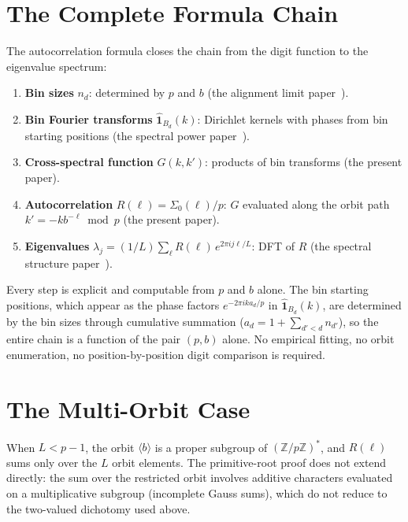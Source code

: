 \documentclass[12pt]{amsart}
\theoremstyle{definition}
\theoremstyle{remark}
\begin{document}
\section{The Complete Formula Chain}

The autocorrelation formula closes the chain from the digit
function to the eigenvalue spectrum:

\begin{enumerate}
\item \textbf{Bin sizes} $n_d$: determined by $p$ and $b$
      (the alignment limit paper~\cite{paper3}).
\item \textbf{Bin Fourier transforms}
      $\widehat{\mathbf{1}}_{B_d}(k)$: Dirichlet kernels with
      phases from bin starting positions (the spectral power
      paper~\cite{paper8}).
\item \textbf{Cross-spectral function} $G(k,k')$: products of
      bin transforms (the present paper).
\item \textbf{Autocorrelation} $R(\ell) = \Sigma_0(\ell)/p$:
      $G$ evaluated along the orbit path
      $k' = -kb^{-\ell} \bmod p$ (the present paper).
\item \textbf{Eigenvalues}
      $\lambda_j = (1/L) \sum_{\ell} R(\ell)\, e^{2\pi i
      j\ell/L}$: DFT of $R$ (the spectral structure
      paper~\cite{paper7}).
\end{enumerate}

Every step is explicit and computable from $p$ and $b$ alone.
The bin starting positions, which appear as the phase factors
$e^{-2\pi i k a_d / p}$ in $\widehat{\mathbf{1}}_{B_d}(k)$, are
determined by the bin sizes through cumulative summation
($a_d = 1 + \sum_{d' < d} n_{d'}$), so the entire chain is a
function of the pair $(p, b)$ alone. No empirical fitting, no
orbit enumeration, no position-by-position digit comparison is
required.

\section{The Multi-Orbit Case}\label{sec:multi-orbit}

When $L < p - 1$, the orbit $\langle b \rangle$ is a proper
subgroup of $(\mathbb{Z}/p\mathbb{Z})^{*}$, and $R(\ell)$ sums
only over the $L$ orbit elements. The primitive-root proof
does not extend directly: the sum over the restricted orbit
involves additive characters evaluated on a multiplicative
subgroup (incomplete Gauss sums), which do not reduce to the
two-valued dichotomy used above.
\end{document}
